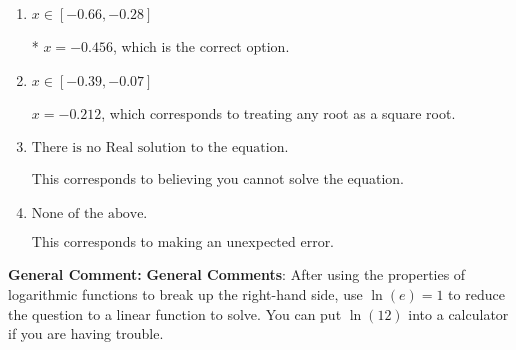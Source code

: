 \documentclass{extbook}[14pt]
\begin{document}
\begin{enumerate}
{\begin{enumerate}[label=\Alph*.]
$x = -3.276$, which corresponds to thinking you don't need to take the natural log of both sides before reducing, as if the equation already had a natural log on the right side.
\item \( x \in [-0.66, -0.28] \)

* $x = -0.456$, which is the correct option.
\item \( x \in [-0.39, -0.07] \)

$x = -0.212$, which corresponds to treating any root as a square root.
\item \( \text{There is no Real solution to the equation.} \)

This corresponds to believing you cannot solve the equation.
\item \( \text{None of the above.} \)

This corresponds to making an unexpected error.
\end{enumerate}

\textbf{General Comment:} \textbf{General Comments}: After using the properties of logarithmic functions to break up the right-hand side, use $\ln(e) = 1$ to reduce the question to a linear function to solve. You can put $\ln(12)$ into a calculator if you are having trouble.
}
\end{enumerate}
\end{document}

